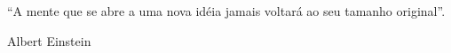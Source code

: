 

\begin{flushright}
\begin{minipage}[r]{10cm}
\vspace{18cm}
``A mente que se abre a uma nova idéia jamais voltará ao seu tamanho original''.
\begin{flushright}
Albert Einstein
\end{flushright}
\end{minipage}
\end{flushright}